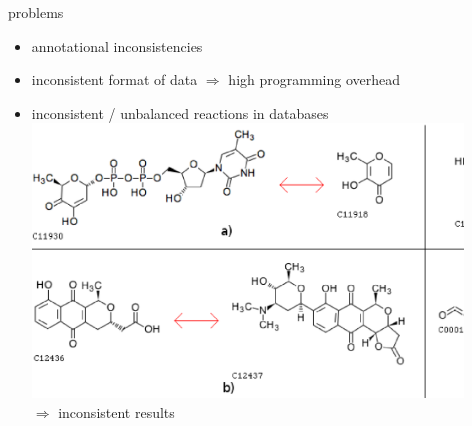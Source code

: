 \documentclass[style=aggie]{powerdot}
\newcommand{\magic}{transmutational} %
\newcommand{\indistinct}{indistinct}
\begin{document}
\begin{slide}{problems}
\begin{itemize}
  \item annotational inconsistencies\newline\pause
  \item inconsistent format of data \pause$\Rightarrow$ high programming overhead\newline\pause
  \item inconsistent / unbalanced reactions in databases\newline \\
  \includegraphics[width=0.9\textwidth]{examples.ps}\\ \pause
  $\Rightarrow$ inconsistent results
\end{itemize}
\end{slide}
\newcommand{\fordataset}{\foreach \Num/\description/\color/\pattern in {
	\the\lastbalanced / balanced \\	reactions:\\	/green/north east lines,
	 \the\lastindistinctive / \indistinct\ reactions:\\/yellow/north west lines,
	\the\lastunbalanced / unbalanced\slash\magic\\reactions:/orange/dots,
	 \the\lastmagic / \magic \\reactions:		/red/vertical lines}
}
\end{document}

